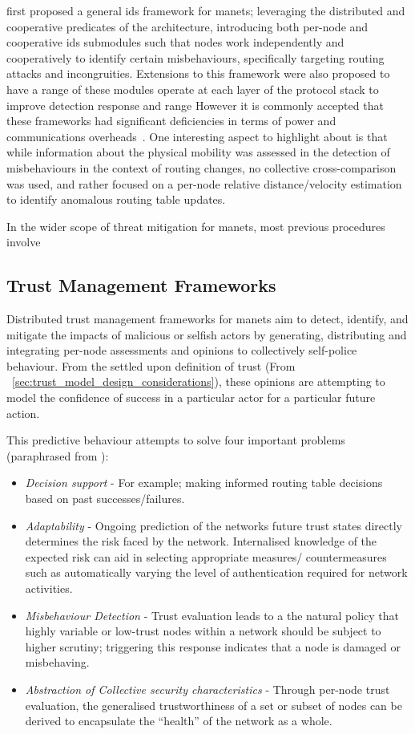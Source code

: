 \citet{zhang2003intrusion} first proposed a general \gls{ids} framework for \glspl{manet}; leveraging the distributed and cooperative predicates of the architecture, introducing both per-node and cooperative \gls{ids} submodules such that nodes work independently and cooperatively to identify certain misbehaviours, specifically targeting routing attacks and incongruities.
Extensions to this framework were also proposed to have a range of these modules operate at each layer of the protocol stack to improve detection response and range\cite{Parker2006}
However it is commonly accepted that these frameworks had significant deficiencies in terms of power and communications overheads~\cite{csen2010security,Ryu2008}.
One interesting aspect to highlight about \citet{zhang2003intrusion} is that while information about the physical mobility was assessed in the detection of misbehaviours in the context of routing changes, no collective cross-comparison was used, and rather focused on a per-node relative distance/velocity estimation to identify anomalous routing table updates.

In the wider scope of threat mitigation for \glspl{manet}, most previous procedures involve 

\subsection{Trust Management Frameworks}\label{sec:tmfs}

Distributed trust management frameworks for \glspl{manet} aim to detect, identify, and mitigate the impacts of malicious or selfish actors by generating, distributing and integrating per-node assessments and opinions to collectively self-police behaviour.
From the settled upon definition of trust (From ~\autoref{sec:trust_model_design_considerations}), these opinions are attempting to model the confidence of success in a particular actor for a particular future action.

This predictive behaviour attempts to solve four important problems (paraphrased from \cite{Sun2008}):
\begin{itemize}
  \item \emph{Decision support} - For example; making informed routing table decisions based on past successes/failures.
  \item \emph{Adaptability} - Ongoing prediction of the networks future trust states directly determines the risk faced by the network. Internalised knowledge of the expected risk can aid in selecting appropriate measures/ countermeasures such as automatically varying the level of authentication required for network activities.
  \item \emph{Misbehaviour Detection} - Trust evaluation leads to a the natural policy that highly variable or low-trust nodes within a network should be subject to higher scrutiny; triggering this response indicates that a node is damaged or misbehaving.
  \item \emph{Abstraction of Collective security characteristics} - Through per-node trust evaluation, the generalised trustworthiness of a set or subset of nodes can be derived to encapsulate the ``health'' of the network as a whole.
\end{itemize}


